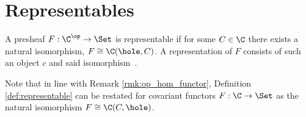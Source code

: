 \section{Representables}

\begin{definition}\label{def:representable}
  A presheaf $F: \C^\op\to \Set$ is representable if for some $C\in\C$ there
  exists a natural isomorphism, $F \cong \C(\hole, C)$. A representation of $F$
  consists of such an object $c$ and said
  isomorphism~\parencite[p.~84]{leinster:basic_category_theory}.
\end{definition}

\begin{remark}
  Note that in line with Remark \ref{rmk:op_hom_functor}, Definition
  \ref{def:representable} can be restated for covariant functors $F:\C\to\Set$ as the natural isomorphism ${F\cong\C(C, \hole)}$.
\end{remark}